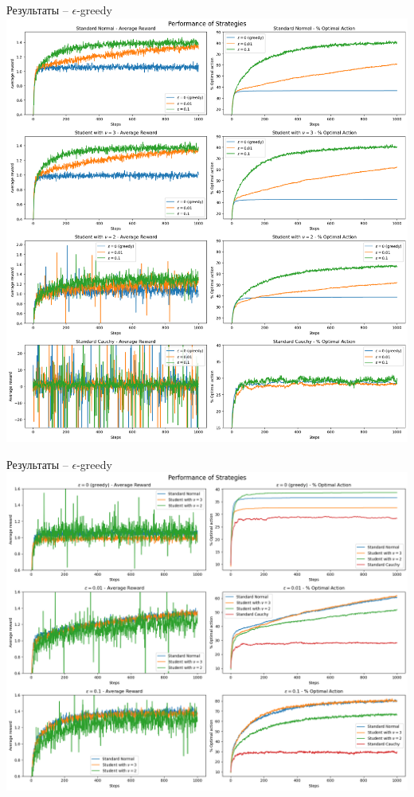 \documentclass[11pt]{beamer} %
\begin{document}
    \begin{frame}{Результаты -- $\epsilon$-greedy}
        \includegraphics[scale=0.13,center]{images/bandit_tester/eps_greedy_1.png}
    \end{frame}
    \begin{frame}{Результаты -- $\epsilon$-greedy}
        \includegraphics[scale=0.13,center]{images/bandit_tester/eps_greedy_2.png}
    \end{frame}
\end{document}
